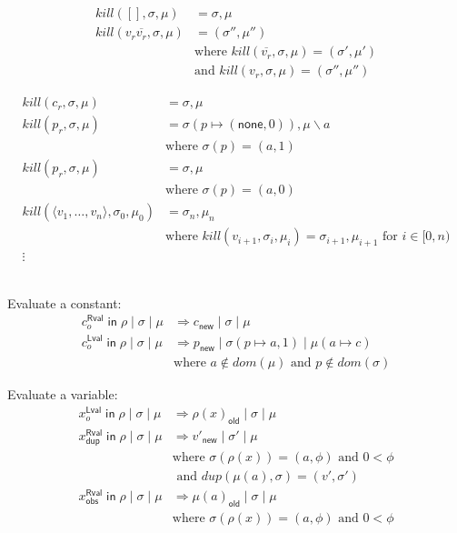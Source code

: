 \documentclass{article}
\newcommand{\IN}{\mathop{\mathsf{in}}}
\newcommand{\RVAL}{\mathsf{Rval}}
\newcommand{\LVAL}{\mathsf{Lval}}
\newcommand{\DUP}{\mathsf{dup}}
\newcommand{\OBS}{\mathsf{obs}}
\newcommand{\INCTX}[4]{\boxed{#1}^{#2}_{#3} \IN #4}
\newcommand{\act}{\text{\ae}}
\begin{document}
\begin{align*}
\mathit{kill}([], \sigma,\mu) &= \sigma,\mu\\
\mathit{kill}(v_r \overline{v_r}, \sigma,\mu) &= (\sigma'', \mu'') \\
 & \text{where } \mathit{kill}(\overline{v_r}, \sigma,\mu) = (\sigma',\mu')\\
 & \text{and } \mathit{kill}(v_r, \sigma,\mu) = (\sigma'',\mu'')
\end{align*}

\begin{align*}
\mathit{kill}(c_r, \sigma,\mu) &= \sigma,\mu\\
\mathit{kill}(p_r, \sigma,\mu) &=  \sigma(p \mapsto (\mathsf{none},0)), \mu \backslash a \\
   & \text{where } \sigma(p) = (a, 1) \\
\mathit{kill}(p_r, \sigma,\mu) &=  \sigma, \mu \\
  & \text{where } \sigma(p) = (a, 0) \\
\mathit{kill}(\langle v_1,\ldots,v_n \rangle, \sigma_0, \mu_0) &= \sigma_n, \mu_n\\
& \text{where } \mathit{kill}(v_{i+1},\sigma_i,\mu_i) = \sigma_{i+1},\mu_{i+1}
\text{ for } i\in [0,n) \\
  \vdots
\end{align*}

\fbox{$\act \mid \sigma \mid \mu \Rightarrow v_r \mid \sigma' \mid \mu'$}\\

Evaluate a constant:
\begin{align*}
  \INCTX{c}{\RVAL}{o}{\rho} \mid \sigma \mid \mu  &
     \Rightarrow c_{\mathsf{new}} \mid \sigma \mid \mu \\
  \INCTX{c}{\LVAL}{o}{\rho} \mid \sigma \mid \mu &
     \Rightarrow p_{\mathsf{new}} \mid \sigma(p \mapsto a, 1) \mid \mu(a \mapsto c) \\
     & \text{where } a \notin \mathit{dom}(\mu)
     \text{ and } p \notin \mathit{dom}(\sigma)
\end{align*}

Evaluate a variable:
\begin{align*}
 \INCTX{x}{\LVAL}{o}{\rho} \mid \sigma \mid \mu &
      \Rightarrow \rho(x)_{\mathsf{old}} \mid \sigma \mid \mu \\
  \INCTX{x}{\RVAL}{\DUP}{\rho} \mid \sigma \mid \mu  &
     \Rightarrow v'_{\mathsf{new}} \mid \sigma' \mid \mu\\
     & \text{where } \sigma(\rho(x)) = (a, \phi) 
       \text{ and } 0 < \phi \\
     &  \text{ and } \mathit{dup}(\mu(a),\sigma) = (v',\sigma') \\
 \INCTX{x}{\RVAL}{\OBS}{\rho} \mid \sigma \mid \mu &
      \Rightarrow \mu(a)_{\mathsf{old}} \mid \sigma \mid \mu\\
     & \text{where } \sigma(\rho(x)) = (a, \phi) 
       \text{ and } 0 < \phi 
\end{align*}
\end{document}
